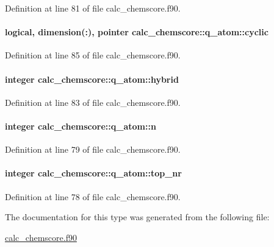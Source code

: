 Definition at line 81 of file calc\-\_\-chemscore.\-f90.

\hypertarget{structcalc__chemscore_1_1q__atom_aae893d503a84fb04f0063651d4b32012}{
\paragraph[{cyclic}]{\setlength{\rightskip}{0pt plus 5cm}logical, dimension(\-:), pointer calc\-\_\-chemscore\-::q\-\_\-atom\-::cyclic}}\label{structcalc__chemscore_1_1q__atom_aae893d503a84fb04f0063651d4b32012}


Definition at line 85 of file calc\-\_\-chemscore.\-f90.

\hypertarget{structcalc__chemscore_1_1q__atom_a88f13993f1131b735ed1b57383871484}{
\paragraph[{hybrid}]{\setlength{\rightskip}{0pt plus 5cm}integer calc\-\_\-chemscore\-::q\-\_\-atom\-::hybrid}}\label{structcalc__chemscore_1_1q__atom_a88f13993f1131b735ed1b57383871484}


Definition at line 83 of file calc\-\_\-chemscore.\-f90.

\hypertarget{structcalc__chemscore_1_1q__atom_a278aca77377ccabcd177be060a8a4c44}{
\paragraph[{n}]{\setlength{\rightskip}{0pt plus 5cm}integer calc\-\_\-chemscore\-::q\-\_\-atom\-::n}}\label{structcalc__chemscore_1_1q__atom_a278aca77377ccabcd177be060a8a4c44}


Definition at line 79 of file calc\-\_\-chemscore.\-f90.

\hypertarget{structcalc__chemscore_1_1q__atom_a45781d30e4d6635063993f5cc255f0d5}{
\paragraph[{top\-\_\-nr}]{\setlength{\rightskip}{0pt plus 5cm}integer calc\-\_\-chemscore\-::q\-\_\-atom\-::top\-\_\-nr}}\label{structcalc__chemscore_1_1q__atom_a45781d30e4d6635063993f5cc255f0d5}


Definition at line 78 of file calc\-\_\-chemscore.\-f90.



The documentation for this type was generated from the following file\-:\begin{DoxyCompactItemize}
\item 
\hyperlink{calc__chemscore_8f90}{calc\-\_\-chemscore.\-f90}\end{DoxyCompactItemize}
